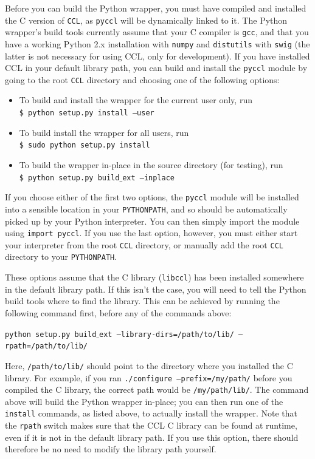 \documentclass[\docopts]{\docclass}
\begin{document}
Before you can build the Python wrapper, you must have compiled and installed the C version of {\tt CCL}, as {\tt pyccl} will be dynamically linked to it. The Python wrapper's build tools currently assume that your C compiler is {\tt gcc}, and that you have a working Python 2.x installation with {\tt numpy} and {\tt distutils} with {\tt swig} (the latter is not necessary for using CCL, only for development). If you have installed CCL in your default library path, you can build and install the {\tt pyccl} module by going to the root {\tt CCL} directory and choosing one of the following options:
\begin{itemize}
 \item To build and install the wrapper for the current user only, run \\
 {\tt \$ python setup.py install --user}
 \item To build install the wrapper for all users, run \\
 {\tt \$ sudo python setup.py install}
 \item To build the wrapper in-place in the source directory (for testing), run \\
 {\tt \$ python setup.py build$\_$ext --inplace}
\end{itemize}
If you choose either of the first two options, the {\tt pyccl} module will be installed into a sensible location in your {\tt PYTHONPATH}, and so should be automatically picked up by your Python interpreter. You can then simply import the module using {\tt import pyccl}. If you use the last option, however, you must either start your interpreter from the root {\tt CCL} directory, or manually add the root {\tt CCL} directory to your {\tt PYTHONPATH}.

These options assume that the C library ({\tt libccl}) has been installed somewhere in the default library path. If this isn't the case, you will need to tell the Python build tools where to find the library. This can be achieved by running the following command first, before any of the commands above:

\texttt{python setup.py build$\_$ext --library-dirs=/path/to/lib/ --rpath=/path/to/lib/}

Here, {\tt /path/to/lib/} should point to the directory where you installed the C library. For example, if you ran {\tt ./configure --prefix=/my/path/} before you compiled the C library, the correct path would be {\tt /my/path/lib/}. The command above will build the Python wrapper in-place; you can then run one of the {\tt install} commands, as listed above, to actually install the wrapper. Note that the {\tt rpath} switch makes sure that the CCL C library can be found at runtime, even if it is not in the default library path. If you use this option, there should therefore be no need to modify the library path yourself.
\end{document}
